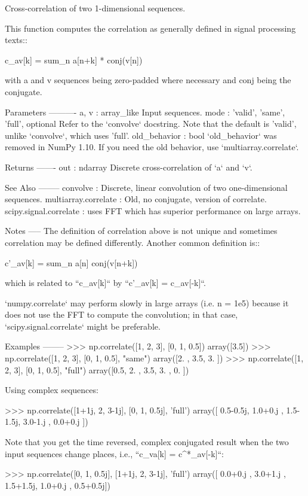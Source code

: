 \begin{DoxyVerb}Cross-correlation of two 1-dimensional sequences.

This function computes the correlation as generally defined in signal
processing texts::

    c_{av}[k] = sum_n a[n+k] * conj(v[n])

with a and v sequences being zero-padded where necessary and conj being
the conjugate.

Parameters
----------
a, v : array_like
    Input sequences.
mode : {'valid', 'same', 'full'}, optional
    Refer to the `convolve` docstring.  Note that the default
    is 'valid', unlike `convolve`, which uses 'full'.
old_behavior : bool
    `old_behavior` was removed in NumPy 1.10. If you need the old
    behavior, use `multiarray.correlate`.

Returns
-------
out : ndarray
    Discrete cross-correlation of `a` and `v`.

See Also
--------
convolve : Discrete, linear convolution of two one-dimensional sequences.
multiarray.correlate : Old, no conjugate, version of correlate.
scipy.signal.correlate : uses FFT which has superior performance on large arrays. 

Notes
-----
The definition of correlation above is not unique and sometimes correlation
may be defined differently. Another common definition is::

    c'_{av}[k] = sum_n a[n] conj(v[n+k])

which is related to ``c_{av}[k]`` by ``c'_{av}[k] = c_{av}[-k]``.

`numpy.correlate` may perform slowly in large arrays (i.e. n = 1e5) because it does
not use the FFT to compute the convolution; in that case, `scipy.signal.correlate` might
be preferable.


Examples
--------
>>> np.correlate([1, 2, 3], [0, 1, 0.5])
array([3.5])
>>> np.correlate([1, 2, 3], [0, 1, 0.5], "same")
array([2. ,  3.5,  3. ])
>>> np.correlate([1, 2, 3], [0, 1, 0.5], "full")
array([0.5,  2. ,  3.5,  3. ,  0. ])

Using complex sequences:

>>> np.correlate([1+1j, 2, 3-1j], [0, 1, 0.5j], 'full')
array([ 0.5-0.5j,  1.0+0.j ,  1.5-1.5j,  3.0-1.j ,  0.0+0.j ])

Note that you get the time reversed, complex conjugated result
when the two input sequences change places, i.e.,
``c_{va}[k] = c^{*}_{av}[-k]``:

>>> np.correlate([0, 1, 0.5j], [1+1j, 2, 3-1j], 'full')
array([ 0.0+0.j ,  3.0+1.j ,  1.5+1.5j,  1.0+0.j ,  0.5+0.5j])\end{DoxyVerb}
 \mbox{\label{namespacenumpy_1_1core_1_1numeric_a2c64f4a657e9277ac9196f1e5c9c8ce3}} 
